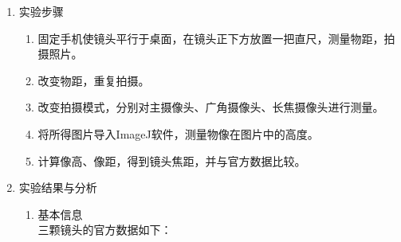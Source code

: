 \documentclass[a4paper]{article}
\begin{document}
\begin{enumerate}[label=\chinese*.,left=0pt]
    \item 实验步骤
    \begin{enumerate}[label=\arabic*.,left=0pt]
        \item 固定手机使镜头平行于桌面，在镜头正下方放置一把直尺，测量物距，拍摄照片。
        \item 改变物距，重复拍摄。
        \item 改变拍摄模式，分别对主摄像头、广角摄像头、长焦摄像头进行测量。
        \item 将所得图片导入ImageJ软件，测量物像在图片中的高度。
        \item 计算像高、像距，得到镜头焦距，并与官方数据比较。
    \end{enumerate}

    \item 实验结果与分析
    \begin{enumerate}[label=\arabic*.,left=0pt]
        \item 基本信息
        \\
        三颗镜头的官方数据如下：
        \begin{table}[H]
            \caption{摄像头基本数据}
            \label{tab:data}
            \centering
        \end{table}


\end{enumerate}
\end{enumerate}
\end{document}
